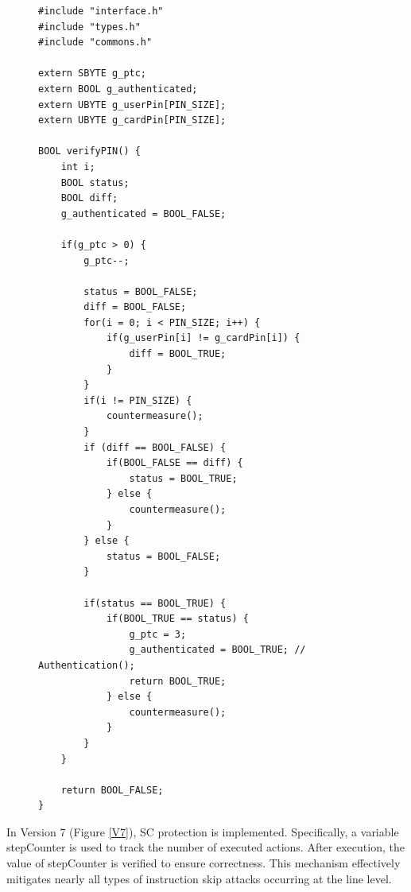 \begin{figure}
\begin{lstlisting}[caption={code.c of VerifyPin function in benchmark V6}, label={V6}, basicstyle=\ttfamily\footnotesize]
#include "interface.h"
#include "types.h"
#include "commons.h"

extern SBYTE g_ptc;
extern BOOL g_authenticated;
extern UBYTE g_userPin[PIN_SIZE];
extern UBYTE g_cardPin[PIN_SIZE];

BOOL verifyPIN() {
    int i;
    BOOL status;
    BOOL diff;
    g_authenticated = BOOL_FALSE;

    if(g_ptc > 0) {
        g_ptc--;

        status = BOOL_FALSE;
        diff = BOOL_FALSE;
        for(i = 0; i < PIN_SIZE; i++) {
            if(g_userPin[i] != g_cardPin[i]) {
                diff = BOOL_TRUE;
            }
        }
        if(i != PIN_SIZE) {
            countermeasure();
        }
        if (diff == BOOL_FALSE) {
            if(BOOL_FALSE == diff) {
                status = BOOL_TRUE;
            } else {
                countermeasure();
            }
        } else {
            status = BOOL_FALSE;
        }

        if(status == BOOL_TRUE) {
            if(BOOL_TRUE == status) {
                g_ptc = 3;
                g_authenticated = BOOL_TRUE; // Authentication();
                return BOOL_TRUE;
            } else {
                countermeasure();
            }
        }
    }

    return BOOL_FALSE;
}
\end{lstlisting}
\end{figure}

In Version 7 (Figure \ref{V7}), SC protection is implemented. Specifically, a variable stepCounter is used to track the number of executed actions. After execution, the value of stepCounter is verified to ensure correctness. This mechanism effectively mitigates nearly all types of instruction skip attacks occurring at the line level.

